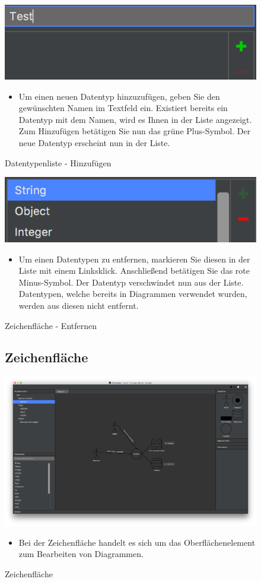 \begin{figure}[h!]
	\centering
	\includegraphics[width=.4\textwidth]{Datentypen_Add.png}
	\caption{Datentypenliste - Hinzufügen}
\begin{itemize}	
\item Um einen neuen Datentyp hinzuzufügen, geben Sie den gewünschten Namen im Textfeld ein. Existiert bereits ein Datentyp mit dem Namen, wird es Ihnen in der Liste angezeigt. Zum Hinzufügen betätigen Sie nun das grüne Plus-Symbol. Der neue Datentyp erscheint nun in der Liste.
\end{itemize}
\end{figure}

\begin{figure}[h!]
	\centering
	\includegraphics[width=.4\textwidth]{Datentypen_Delete.png}
	\caption{Zeichenfläche - Entfernen}
\begin{itemize}	
\item Um einen Datentypen zu entfernen, markieren Sie diesen in der Liste mit einem Linksklick. Anschließend betätigen Sie das rote Minus-Symbol. Der Datentyp verschwindet nun aus der Liste. Datentypen, welche bereits in Diagrammen verwendet wurden, werden aus diesen nicht entfernt.
\end{itemize}
\end{figure}




\begin{figure}[h!]
\subsection{Zeichenfläche}
	\centering
	\includegraphics[width=1\textwidth]{Design_Dark.png}
	\caption{Zeichenfläche}	
\begin{itemize}	
\item Bei der Zeichenfläche handelt es sich um das Oberflächenelement zum Bearbeiten von Diagrammen. 
\end{itemize}
\end{figure}

